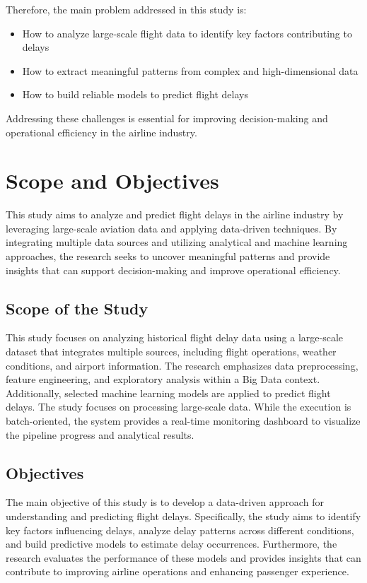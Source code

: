 \documentclass[12pt,a4paper]{report}
\begin{document}
Therefore, the main problem addressed in this study is:

\begin{itemize}
    \item How to analyze large-scale flight data to identify key factors contributing to delays
    \item How to extract meaningful patterns from complex and high-dimensional data
    \item How to build reliable models to predict flight delays
\end{itemize}

Addressing these challenges is essential for improving decision-making and operational efficiency in the airline industry.

\section{Scope and Objectives}

This study aims to analyze and predict flight delays in the airline industry by leveraging large-scale aviation data and applying data-driven techniques. By integrating multiple data sources and utilizing analytical and machine learning approaches, the research seeks to uncover meaningful patterns and provide insights that can support decision-making and improve operational efficiency.

\subsection{Scope of the Study}

This study focuses on analyzing historical flight delay data using a large-scale dataset that integrates multiple sources, including flight operations, weather conditions, and airport information. The research emphasizes data preprocessing, feature engineering, and exploratory analysis within a Big Data context. Additionally, selected machine learning models are applied to predict flight delays. The study focuses on processing large-scale data. While the execution is batch-oriented, the system provides a real-time monitoring dashboard to visualize the pipeline progress and analytical results.

\subsection{Objectives}

The main objective of this study is to develop a data-driven approach for understanding and predicting flight delays. Specifically, the study aims to identify key factors influencing delays, analyze delay patterns across different conditions, and build predictive models to estimate delay occurrences. Furthermore, the research evaluates the performance of these models and provides insights that can contribute to improving airline operations and enhancing passenger experience.
\end{document}
